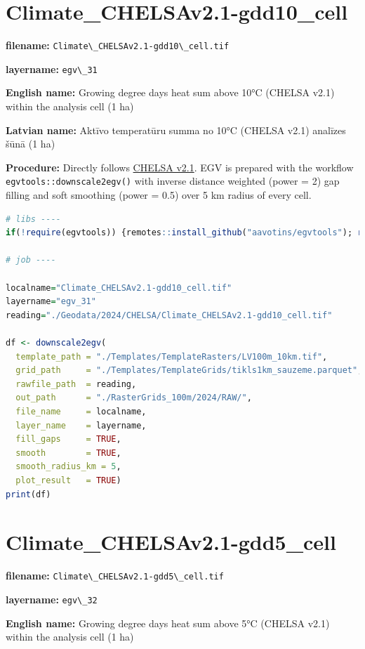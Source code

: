 \documentclass[
]{book}
\newcommand{\passthrough}[1]{#1}
\begin{document}
\section{Climate\_CHELSAv2.1-gdd10\_cell}\label{ch06.031}

\textbf{filename:} \passthrough{\lstinline!Climate\_CHELSAv2.1-gdd10\_cell.tif!}

\textbf{layername:} \passthrough{\lstinline!egv\_31!}

\textbf{English name:} Growing degree days heat sum above 10°C (CHELSA v2.1) within the analysis cell (1 ha)

\textbf{Latvian name:} Aktīvo temperatūru summa no 10°C (CHELSA v2.1) analīzes šūnā (1 ha)

\textbf{Procedure:} Directly follows \hyperref[Ch04.11]{CHELSA v2.1}. EGV is prepared with the
workflow \passthrough{\lstinline!egvtools::downscale2egv()!} with inverse distance weighted (power = 2)
gap filling and soft smoothing (power = 0.5) over 5 km radius of every cell.

\begin{lstlisting}[language=R]
# libs ----
if(!require(egvtools)) {remotes::install_github("aavotins/egvtools"); require(egvtools)}

# job ----

localname="Climate_CHELSAv2.1-gdd10_cell.tif"
layername="egv_31"
reading="./Geodata/2024/CHELSA/Climate_CHELSAv2.1-gdd10_cell.tif"

df <- downscale2egv(
  template_path = "./Templates/TemplateRasters/LV100m_10km.tif",
  grid_path     = "./Templates/TemplateGrids/tikls1km_sauzeme.parquet",
  rawfile_path  = reading,
  out_path      = "./RasterGrids_100m/2024/RAW/",
  file_name     = localname,
  layer_name    = layername,
  fill_gaps     = TRUE,
  smooth        = TRUE,
  smooth_radius_km = 5,
  plot_result   = TRUE)
print(df)
\end{lstlisting}

\section{Climate\_CHELSAv2.1-gdd5\_cell}\label{ch06.032}

\textbf{filename:} \passthrough{\lstinline!Climate\_CHELSAv2.1-gdd5\_cell.tif!}

\textbf{layername:} \passthrough{\lstinline!egv\_32!}

\textbf{English name:} Growing degree days heat sum above 5°C (CHELSA v2.1) within the analysis cell (1 ha)
\end{document}
